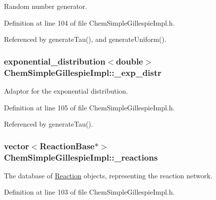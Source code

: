 Random number generator. 



Definition at line 104 of file Chem\+Simple\+Gillespie\+Impl.\+h.



Referenced by generate\+Tau(), and generate\+Uniform().

\hypertarget{classChemSimpleGillespieImpl_a87869183785fdf1117241ddc72717d3d}{
\subsubsection[{\+\_\+exp\+\_\+distr}]{\setlength{\rightskip}{0pt plus 5cm}exponential\+\_\+distribution$<$double$>$ Chem\+Simple\+Gillespie\+Impl\+::\+\_\+exp\+\_\+distr\hspace{0.3cm}{\ttfamily [private]}}}\label{classChemSimpleGillespieImpl_a87869183785fdf1117241ddc72717d3d}


Adaptor for the exponential distribution. 



Definition at line 105 of file Chem\+Simple\+Gillespie\+Impl.\+h.



Referenced by generate\+Tau().

\hypertarget{classChemSimpleGillespieImpl_a5f852154e8298303a41f33fc5d77a3c7}{
\subsubsection[{\+\_\+reactions}]{\setlength{\rightskip}{0pt plus 5cm}vector$<${\bf Reaction\+Base}$\ast$$>$ Chem\+Simple\+Gillespie\+Impl\+::\+\_\+reactions\hspace{0.3cm}{\ttfamily [private]}}}\label{classChemSimpleGillespieImpl_a5f852154e8298303a41f33fc5d77a3c7}


The database of \hyperlink{classReaction}{Reaction} objects, representing the reaction network. 



Definition at line 103 of file Chem\+Simple\+Gillespie\+Impl.\+h.



